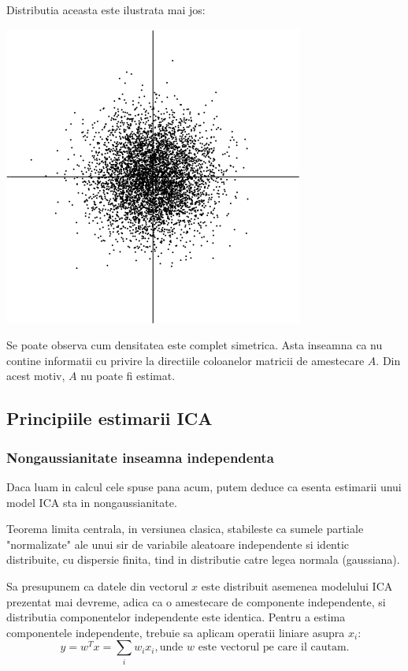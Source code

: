 \documentclass[12pt]{article}
\begin{document}
Distributia aceasta este ilustrata mai jos:
\begin{center}
	\includegraphics[scale=0.9]{multivariate_gaussian_distribution}
 \end{center}
 Se poate observa cum densitatea este complet simetrica. Asta inseamna ca nu contine informatii cu privire la directiile coloanelor matricii de amestecare $A$. Din acest motiv, $A$ nu poate fi estimat.

 \subsection{Principiile estimarii ICA}
 \subsubsection{Nongaussianitate inseamna independenta}
 Daca luam in calcul cele spuse pana acum, putem deduce ca esenta estimarii unui model ICA sta in nongaussianitate.

 Teorema limita centrala, in versiunea clasica, stabileste ca sumele partiale "normalizate" ale unui sir de variabile aleatoare independente si identic distribuite, cu dispersie finita, tind in distributie catre legea normala (gaussiana). 

 Sa presupunem ca datele din vectorul $x$ este distribuit asemenea modelului ICA prezentat mai devreme, adica ca o amestecare de componente independente, si distributia componentelor independente este  identica. Pentru a estima componentele independente, trebuie sa aplicam operatii liniare asupra $x_i$:
 \begin{equation}
	y=w^Tx=\sum_{i}w_ix_i, \text{unde $w$ este vectorul pe care il cautam.}
 \end{equation}
\end{document}
